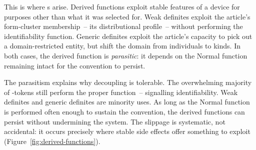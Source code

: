 This is where s arise. Derived functions exploit stable features of a device for purposes other than what it was selected for. Weak definites exploit the article's form-cluster membership~-- its distributional profile~-- without performing the identifiability function. Generic definites exploit the article's capacity to pick out a domain-restricted entity, but shift the domain from individuals to kinds. In both cases, the derived function is \emph{parasitic}: it depends on the Normal function remaining intact for the convention to persist.

The parasitism explains why decoupling is tolerable. The overwhelming majority of -tokens still perform the proper function~-- signalling identifiability. Weak definites and generic definites are minority uses. As long as the Normal function is performed often enough to sustain the convention, the derived functions can persist without undermining the system. The slippage is systematic, not accidental: it occurs precisely where stable side effects offer something to exploit (Figure~\ref{fig:derived-functions}).

